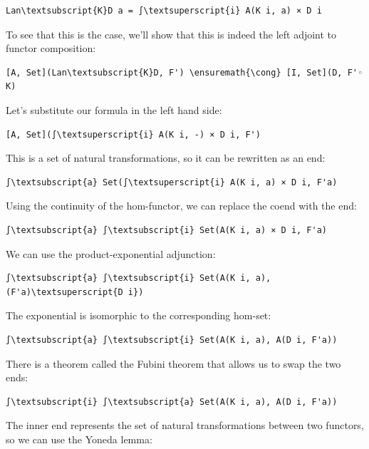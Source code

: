 \begin{Verbatim}[commandchars=\\\{\}]
Lan\textsubscript{K}D a = ∫\textsuperscript{i} A(K i, a) × D i
\end{Verbatim}
To see that this is the case, we'll show that this is indeed the left
adjoint to functor composition:

\begin{Verbatim}[commandchars=\\\{\}]
[A, Set](Lan\textsubscript{K}D, F') \ensuremath{\cong} [I, Set](D, F'◦ K)
\end{Verbatim}
Let's substitute our formula in the left hand side:

\begin{Verbatim}[commandchars=\\\{\}]
[A, Set](∫\textsuperscript{i} A(K i, -) × D i, F')
\end{Verbatim}
This is a set of natural transformations, so it can be rewritten as an
end:

\begin{Verbatim}[commandchars=\\\{\}]
∫\textsubscript{a} Set(∫\textsuperscript{i} A(K i, a) × D i, F'a)
\end{Verbatim}
Using the continuity of the hom-functor, we can replace the coend with
the end:

\begin{Verbatim}[commandchars=\\\{\}]
∫\textsubscript{a} ∫\textsubscript{i} Set(A(K i, a) × D i, F'a)
\end{Verbatim}
We can use the product-exponential adjunction:

\begin{Verbatim}[commandchars=\\\{\}]
∫\textsubscript{a} ∫\textsubscript{i} Set(A(K i, a), (F'a)\textsuperscript{D i})
\end{Verbatim}
The exponential is isomorphic to the corresponding hom-set:

\begin{Verbatim}[commandchars=\\\{\}]
∫\textsubscript{a} ∫\textsubscript{i} Set(A(K i, a), A(D i, F'a))
\end{Verbatim}
There is a theorem called the Fubini theorem that allows us to swap the
two ends:

\begin{Verbatim}[commandchars=\\\{\}]
∫\textsubscript{i} ∫\textsubscript{a} Set(A(K i, a), A(D i, F'a))
\end{Verbatim}
The inner end represents the set of natural transformations between two
functors, so we can use the Yoneda lemma:

